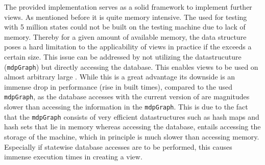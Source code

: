 \documentclass[preview]{standalone}
\begin{document}
The provided implementation serves as a solid framework to implement further views. As mentioned before it is quite memory intensive. The \mdpN used for testing with 5 million states could not be built on the testing machine due to lack of memory. Thereby for a given amount of available memory, the data structure poses a hard limitation to the applicability of views in practice if the \mdpN exceeds a certain size. This issue can be addressed by not utilizing the datastrucuture (\texttt{mdpGraph}) but directly accessing the database. This enables views to be used on almost arbitrary large \mdpsN. While this is a great advantage its downside is an immense drop in performance (rise in built times), compared to the used \texttt{mdpGraph}, as the database accesses with the current version of \pmcvis are magnitudes slower than accessing the information in the \texttt{mdpGraph}. This is due to the fact that the \texttt{mdpGraph} consists of very efficient datastructures such as hash maps and hash sets that lie in memory whereas accessing the database, entails accessing the storage of the machine, which in principle is much slower than accessing memory. Especially if statewise database accesses are to be performed, this causes immense execution times in creating a view.
\end{document}

